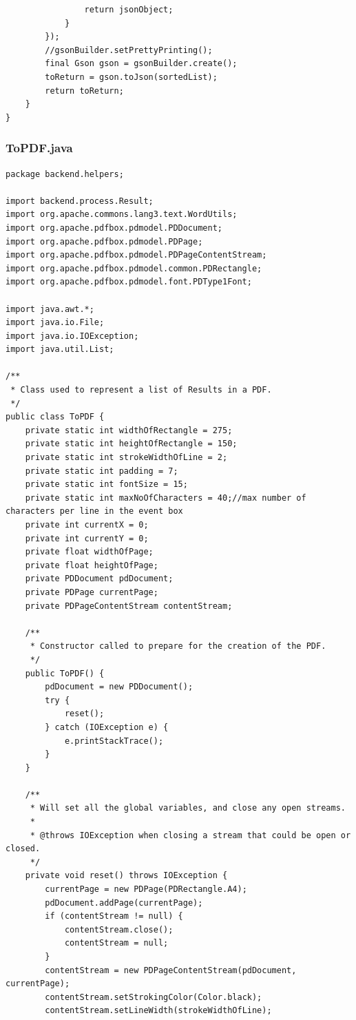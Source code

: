 \begin{lstlisting}
                return jsonObject;
            }
        });
        //gsonBuilder.setPrettyPrinting();
        final Gson gson = gsonBuilder.create();
        toReturn = gson.toJson(sortedList);
        return toReturn;
    }
}
\end{lstlisting}
\subsubsection{ToPDF.java}
\begin{lstlisting}
package backend.helpers;

import backend.process.Result;
import org.apache.commons.lang3.text.WordUtils;
import org.apache.pdfbox.pdmodel.PDDocument;
import org.apache.pdfbox.pdmodel.PDPage;
import org.apache.pdfbox.pdmodel.PDPageContentStream;
import org.apache.pdfbox.pdmodel.common.PDRectangle;
import org.apache.pdfbox.pdmodel.font.PDType1Font;

import java.awt.*;
import java.io.File;
import java.io.IOException;
import java.util.List;

/**
 * Class used to represent a list of Results in a PDF.
 */
public class ToPDF {
    private static int widthOfRectangle = 275;
    private static int heightOfRectangle = 150;
    private static int strokeWidthOfLine = 2;
    private static int padding = 7;
    private static int fontSize = 15;
    private static int maxNoOfCharacters = 40;//max number of characters per line in the event box
    private int currentX = 0;
    private int currentY = 0;
    private float widthOfPage;
    private float heightOfPage;
    private PDDocument pdDocument;
    private PDPage currentPage;
    private PDPageContentStream contentStream;

    /**
     * Constructor called to prepare for the creation of the PDF.
     */
    public ToPDF() {
        pdDocument = new PDDocument();
        try {
            reset();
        } catch (IOException e) {
            e.printStackTrace();
        }
    }

    /**
     * Will set all the global variables, and close any open streams.
     *
     * @throws IOException when closing a stream that could be open or closed.
     */
    private void reset() throws IOException {
        currentPage = new PDPage(PDRectangle.A4);
        pdDocument.addPage(currentPage);
        if (contentStream != null) {
            contentStream.close();
            contentStream = null;
        }
        contentStream = new PDPageContentStream(pdDocument, currentPage);
        contentStream.setStrokingColor(Color.black);
        contentStream.setLineWidth(strokeWidthOfLine);


\end{lstlisting}
